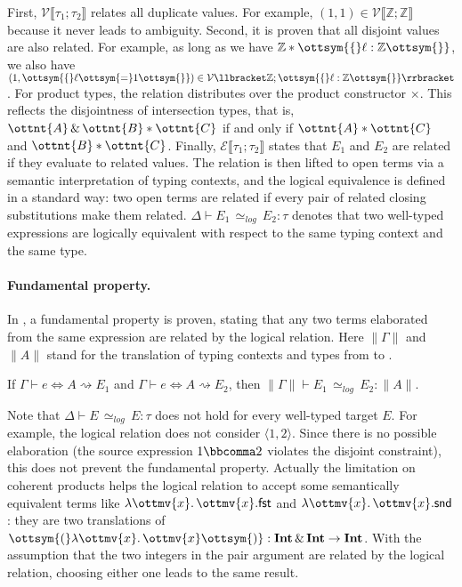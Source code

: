 First, $\mathcal{V} \llbracket \tau_1 ; \tau_2 \rrbracket$
relates all duplicate values. For example,
$(1,1) \in \mathcal{V} \llbracket  \mathbb{Z}  ;  \mathbb{Z}  \rrbracket$
because it never leads to ambiguity. Second, it is proven that all disjoint
values are also related. For example, as long as we have
$ \mathbb{Z}   *  \ottsym{\{}  \ell  :   \mathbb{Z}   \ottsym{\}}$, we also have
$(1,\ottsym{\{}  \ell  \ottsym{=}  1  \ottsym{\}}) \in \mathcal{V} \llbracket  \mathbb{Z}  ; \ottsym{\{}  \ell  :   \mathbb{Z}   \ottsym{\}} \rrbracket$.
For product types, the relation distributes over the product constructor
$\times$. This reflects the disjointness of intersection types, that is,
$\ottnt{A}  \, {\&} \,  \ottnt{B}  *  \ottnt{C}$ if and only if $\ottnt{A}  *  \ottnt{C}$ and $\ottnt{B}  *  \ottnt{C}$. Finally,
$\mathcal{E} \llbracket \tau_1 ; \tau_2 \rrbracket$ states that $E_1$ and $E_2$
are related if they evaluate to related values. The relation is then lifted to
open terms via a semantic interpretation of typing contexts, and the logical
equivalence is defined in a standard way: two open terms are related if every
pair of related closing substitutions make them related.
$\Delta \vdash E_1 \, {\simeq}_\mathit{log} \, E_2 :\tau$ denotes that two
well-typed expressions are logically equivalent with respect to the same typing
context and the same type.

\paragraph{Fundamental property.}
In \necolus, a fundamental property is proven, stating that any two \lambdac
terms elaborated from the same \necolus expression are related by the logical
relation. Here $\|\Gamma\|$ and $\|A\|$ stand for the translation of typing
contexts and types from \necolus to \lambdac.

\begin{theorem}
  If \( \Gamma \vdash e \Leftrightarrow A \rightsquigarrow E_1 \)
  and \( \Gamma \vdash e \Leftrightarrow A \rightsquigarrow E_2 \),
  then \( \|\Gamma\| \vdash E_1 \, {\simeq}_\mathit{log} \, E_2 : \|A\| \).
\end{theorem}

\noindent
Note that $\Delta \vdash E \, {\simeq}_\mathit{log} \, E :\tau$ does not hold
for every well-typed target $E$. For example, the logical relation does not
consider $ \langle  1 ,  2  \rangle $. Since there is no possible elaboration (the source
expression $1  \bbcomma  2$ violates the disjoint constraint), this does not prevent
the fundamental property. Actually the limitation on coherent products helps the
logical relation to accept some semantically equivalent terms like
$  \lambda \ottmv{x} .\, \ottmv{x}   . \mathsf{fst} $ and $  \lambda \ottmv{x} .\, \ottmv{x}   . \mathsf{snd} $: they are two translations of
$\ottsym{(}   \lambda \ottmv{x} .\, \ottmv{x}   \ottsym{)}  :   \mathbf{Int}   \, {\&} \,   \mathbf{Int}   \rightarrow   \mathbf{Int} $. With the assumption that the two integers in the
pair argument are related by the logical relation, choosing either one leads to
the same result.

